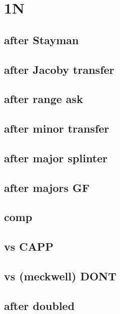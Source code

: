 \section{1N}


\subsection{after Stayman}


\subsection{after Jacoby transfer}


\subsection{after range ask}


\subsection{after minor transfer}


\subsection{after major splinter}


\subsection{after majors GF}


\subsection{comp}


\subsection{vs CAPP}


\subsection{vs (meckwell) DONT}



\subsection{after doubled}


